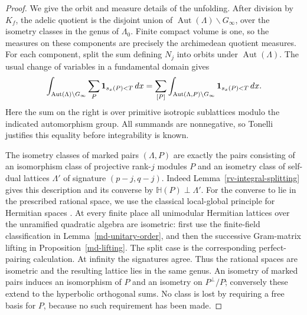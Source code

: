 \begin{proof}
We give the orbit and measure details of the unfolding.
After division by $K_f$, the adelic quotient is the
disjoint union of
$\operatorname{Aut}(\Lambda)\backslash G_\infty$,
over the isometry classes in the genus of $\Lambda_0$.
Finite compact volume is one, so the measures on these
components are precisely the archimedean quotient
measures.  For each component, split the sum defining
$N_j$ into orbits under $\operatorname{Aut}(\Lambda)$.
The usual change of variables in a fundamental domain
gives
\[
 \int_{\operatorname{Aut}(\Lambda)\backslash G_\infty}
                    \sum_P {\bf1}_{s_x(P)<T}\,dx
  =\sum_{[P]}
       \int_{\operatorname{Aut}(\Lambda,P)\backslash G_\infty}
                                  {\bf1}_{s_x(P)<T}\,dx .
\]
Here the sum on the right is over primitive isotropic
sublattices modulo the indicated automorphism group.
All summands are nonnegative, so Tonelli justifies
this equality before integrability is known.

The isometry classes of marked pairs $(\Lambda,P)$
are exactly the pairs consisting of an isomorphism
class of projective rank-$j$ modules $P$ and an
isometry class of self-dual lattices $\Lambda'$ of
signature $(p-j,q-j)$.
Indeed Lemma~\ref{rv-integral-splitting} gives this
description and its converse by
$\mathbb H(P)\perp\Lambda'$.
For the converse to lie in the prescribed rational
space, we use the classical local-global principle
for Hermitian spaces
\cite[Theorem 2.4.1]{kirschmer-herm}.
At every finite place all unimodular Hermitian
lattices over the unramified quadratic algebra are
isometric: first use the finite-field classification
in Lemma~\ref{md-unitary-order}, and then the successive
Gram-matrix lifting in Proposition~\ref{md-lifting}.
The split case is the corresponding perfect-pairing
calculation.  At infinity the signatures agree.
Thus the rational spaces are isometric and the
resulting lattice lies in the same genus.
An isometry of marked pairs induces an isomorphism
of $P$ and an isometry on $P^\perp/P$; conversely
these extend to the hyperbolic orthogonal sums.
No class is lost by requiring a free basis for $P$,
because no such requirement has been made.


\end{proof}
